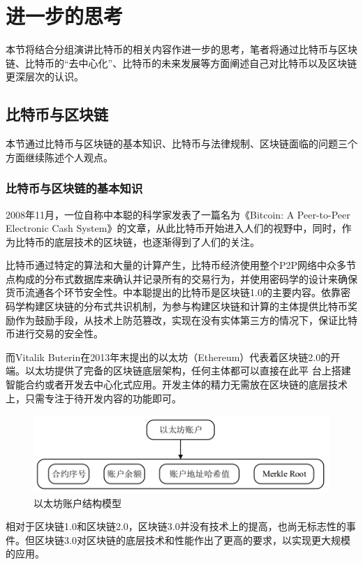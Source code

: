 \documentclass{article}
\begin{document}
\section{进一步的思考}
本节将结合分组演讲比特币的相关内容作进一步的思考，笔者将通过比特币与区块链、比特币的“去中心化”、比特币的未来发展等方面阐述自己对比特币以及区块链更深层次的认识。\par
\subsection{比特币与区块链}
本节通过比特币与区块链的基本知识、比特币与法律规制、区块链面临的问题三个方面继续陈述个人观点。\par
\subsubsection{比特币与区块链的基本知识}
2008年11月，一位自称中本聪的科学家发表了一篇名为《Bitcoin: A Peer-to-Peer Electronic Cash System》的文章，从此比特币开始进入人们的视野中，同时，作为比特币的底层技术的区块链，也逐渐得到了人们的关注。\par
比特币通过特定的算法和大量的计算产生，比特币经济使用整个P2P网络中众多节点构成的分布式数据库来确认并记录所有的交易行为，并使用密码学的设计来确保货币流通各个环节安全性。中本聪提出的比特币是区块链1.0的主要内容。依靠密码学构建区块链的分布式共识机制，为参与构建区块链和计算的主体提供比特币奖励作为鼓励手段，从技术上防范篡改，实现在没有实体第三方的情况下，保证比特币进行交易的安全性。\par
而Vitalik Buterin在2013年末提出的以太坊（Ethereum）代表着区块链2.0的开端。以太坊提供了完备的区块链底层架构，任何主体都可以直接在此平 台上搭建智能合约或者开发去中心化式应用。开发主体的精力无需放在区块链的底层技术上，只需专注于待开发内容的功能即可\citep{liuyanghe}。\par
\begin{figure}[h!]
	\centering
	\includegraphics[scale=0.6]{ytf}
	\caption{以太坊账户结构模型}
	\label{fig:ytf}
\end{figure}
相对于区块链1.0和区块链2.0，区块链3.0并没有技术上的提高，也尚无标志性的事件。但区块链3.0对区块链的底层技术和性能作出了更高的要求，以实现更大规模的应用。\par
\end{document}
